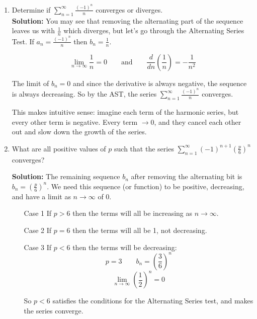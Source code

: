 \documentclass[12pt]{report}
\begin{document}
\begin{enumerate}

	\item Determine if $ \sum_{n=1}^{\infty} \frac{(-1)^n}{n} $ converges or diverges. \\
	
	\textbf{Solution:} You may see that removing the alternating part of the sequence leaves us with $ \frac{1}{n} $ which diverges, but let's go through the Alternating Series Test. If $ a_n = \frac{(-1)^n}{n} $ then $ b_n = \frac{1}{n} $.
	
	$$
		\lim_{n\to\infty} \frac{1}{n} = 0
		\quad \quad \text{and} \quad \quad
		\frac{d}{dn} \left( \frac{1}{n} \right) = -\frac{1}{n^2}
	$$

	The limit of $ b_n = 0 $ and since the derivative is always negative, the sequence is always decreasing. So by the AST, the series $ \sum_{n=1}^{\infty} \frac{(-1)^n}{n} $ converges.
	
	This makes intuitive sense: imagine each term of the harmonic series, but every other term is negative. Every term $ \to 0 $, and they cancel each other out and slow down the growth of the series. 



	\item What are all positive values of $ p $ such that the series $ \sum_{n=1}^{\infty} (-1)^{n+1} \left( \frac{p}{6} \right)^n $ converges?
	
	\textbf{Solution:} The remaining sequence $ b_n $ after removing the alternating bit is $ b_n = \left( \frac{p}{6} \right)^n $. We need this sequence (or function) to be positive, decreasing, and have a limit as $ n\to\infty $ of 0.
	
	\begin{itemize}
		\item[Case 1] \quad If $ p > 6 $ then the terms will all be increasing as $ n\to\infty $.
		\item[Case 2] \quad If $ p = 6 $ then the terms will all be 1, not decreasing.
		\item[Case 3] \quad If $ p < 6 $ then the terms will be decreasing:
		$$
			p = 3 \quad \quad
			b_n = \left( \frac{3}{6} \right)^n
		$$
		$$ \lim_{n\to\infty} \left( \frac{1}{2} \right)^n = 0 $$
		
		So $ p < 6 $ satisfies the conditions for the Alternating Series test, and makes the series converge. 
	\end{itemize}
	
\end{enumerate}
\end{document}
